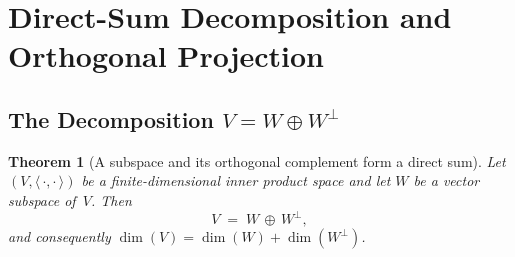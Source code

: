\documentclass[11pt, a4paper, notitlepage]{report}
\newtheorem{theorem}{Theorem}[section]
\theoremstyle{definition}
\theoremstyle{remark}
\begin{document}
\section{Direct-Sum Decomposition and Orthogonal Projection}
\label{sec:direct-sum-decomp}

\subsection{The Decomposition $V = W\oplus W^\perp$}
\label{subsec:direct-sum-decomp}

\begin{theorem}[A subspace and its orthogonal complement form a direct sum]
\label{thm:direct-sum-decomp}
Let $(V,\langle\,\cdot,\cdot\,\rangle)$ be a \emph{finite-dimensional}
inner product space and let $W$ be a vector subspace of~$V$. Then
\[
  V \;=\; W\,\oplus\, W^\perp,
\]
and consequently $\dim(V) = \dim(W) + \dim(W^\perp)$.
\end{theorem}
\end{document}
